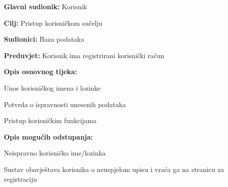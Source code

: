 					\noindent {}
					\begin{packed_item}
						
						\item \textbf{Glavni sudionik: }Korisnik
						\item  \textbf{Cilj:} Pristup korisničkom sučelju 
						\item  \textbf{Sudionici:} Baza podataka
						\item  \textbf{Preduvjet:} Korisnik ima registrirani korisnički račun
						\item  \textbf{Opis osnovnog tijeka:}
						
						\item[] \begin{packed_enum}
							
							\item Unos korisničkog imena i lozinke 
							\item Potvrda o ispravnosti unesenih podataka 
							\item Pristup korisničkim funkcijama
						\end{packed_enum}
						
						\item  \textbf{Opis mogućih odstupanja:}
						
						\item[] \begin{packed_item}
							
							\item[1.a] Neispravno korisničko ime/lozinka
							\item[] \begin{packed_enum}
								
								\item Sustav obavještava korisnika o neuspjelom upisu i vraća ga na stranicu za registraciju 
								
							\end{packed_enum}
							
						\end{packed_item}
					\end{packed_item}
					
